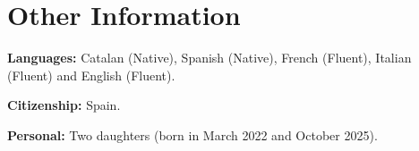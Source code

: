 
\section{Other Information}
\textbf{Languages:} Catalan (Native), Spanish (Native), French (Fluent), Italian (Fluent) and English (Fluent).

\textbf{Citizenship:} Spain.

\textbf{Personal:} Two daughters (born in March 2022 and October 2025).


